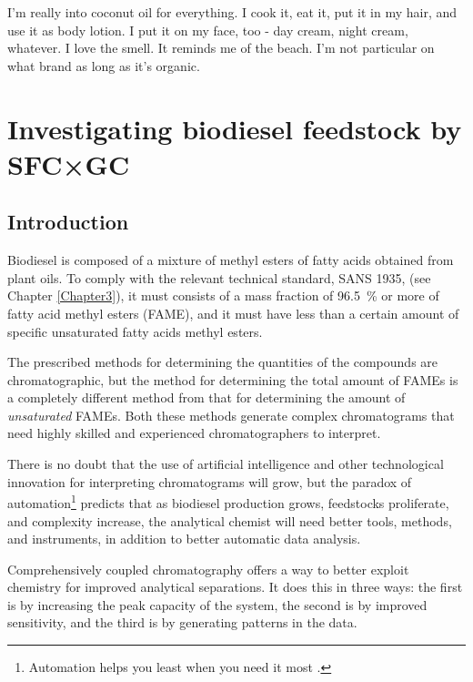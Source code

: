 
\begin{savequote}[80mm] I'm really into coconut oil for everything. I cook it,
eat it, put it in my hair, and use it as body lotion. I put it on my face, too -
day cream, night cream, whatever. I love the smell. It reminds me of the beach.
I'm not particular on what brand as long as it's organic.

\end{savequote}

\chapter{Investigating biodiesel feedstock by SFC×GC} %

\label{Chapter6} %

\section{Introduction}


Biodiesel is composed of a mixture of methyl esters of fatty acids obtained from
plant oils. To comply with the relevant technical standard, SANS 1935,
\autocite{SANS1935} (see Chapter \ref{Chapter3}), it must consists of a mass
fraction of \SI{96.5}{\percent} or more of fatty acid methyl esters (FAME), and
it must have less than a certain amount of specific unsaturated fatty acids
methyl esters.

The prescribed methods for determining the quantities of the compounds are
chromatographic, but the method for  determining the total amount of FAMEs is a
completely different method from that for determining the amount of
\textit{unsaturated} FAMEs. Both these methods generate complex chromatograms
that need highly skilled and experienced chromatographers to interpret. 

There is no doubt that the use of artificial intelligence and other
technological innovation for interpreting chromatograms will grow, but the
paradox of automation\footnote{Automation helps you least when you need it most
\autocite{Strauch2018, Bainbridge1983}.} predicts that as biodiesel production
grows, feedstocks proliferate, and complexity increase, the analytical chemist
will need better tools, methods, and instruments, in addition to better
automatic data analysis.

Comprehensively coupled chromatography offers a way to better exploit chemistry
for improved analytical separations. It does this in three ways: the first is by
increasing the peak capacity of the system, the second is by improved
sensitivity, and the third is by generating patterns in the data.


